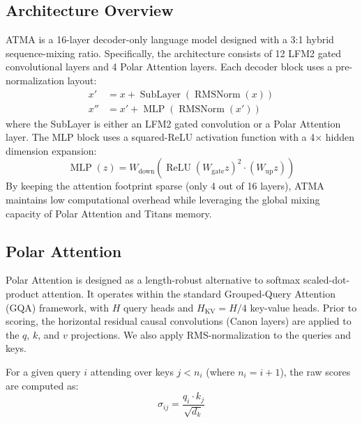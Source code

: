 \documentclass{article} %
\begin{document}
\subsection{Architecture Overview}
ATMA is a 16-layer decoder-only language model designed with a 3:1 hybrid sequence-mixing ratio. Specifically, the architecture consists of 12 LFM2 gated convolutional layers and 4 Polar Attention layers. Each decoder block uses a pre-normalization layout:
\begin{align}
    x' &= x + \operatorname{SubLayer}(\operatorname{RMSNorm}(x)) \\
    x'' &= x' + \operatorname{MLP}(\operatorname{RMSNorm}(x'))
\end{align}
where the SubLayer is either an LFM2 gated convolution or a Polar Attention layer. The MLP block uses a squared-ReLU activation function with a 4$\times$ hidden dimension expansion:
\begin{equation}
    \operatorname{MLP}(z) = W_{\text{down}}\left( \operatorname{ReLU}(W_{\text{gate}} z)^2 \cdot (W_{\text{up}} z) \right)
\end{equation}
By keeping the attention footprint sparse (only 4 out of 16 layers), ATMA maintains low computational overhead while leveraging the global mixing capacity of Polar Attention and Titans memory.

\subsection{Polar Attention}
Polar Attention is designed as a length-robust alternative to softmax scaled-dot-product attention. It operates within the standard Grouped-Query Attention (GQA) framework, with $H$ query heads and $H_{\text{KV}} = H / 4$ key-value heads. Prior to scoring, the horizontal residual causal convolutions (Canon layers) are applied to the $q$, $k$, and $v$ projections. We also apply RMS-normalization to the queries and keys.

For a given query $i$ attending over keys $j < n_i$ (where $n_i = i + 1$), the raw scores are computed as:
\begin{equation}
    \sigma_{ij} = \frac{q_i \cdot k_j}{\sqrt{d_k}}
\end{equation}
\end{document}
